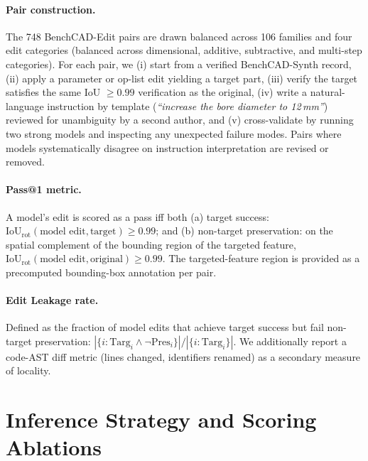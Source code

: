 \documentclass{article}
\begin{document}
\paragraph{Pair construction.} The 748 BenchCAD-Edit pairs are drawn balanced across 106 families and four edit categories (balanced across dimensional, additive, subtractive, and multi-step categories). For each pair, we (i) start from a verified BenchCAD-Synth record, (ii) apply a parameter or op-list edit yielding a target part, (iii) verify the target satisfies the same IoU $\geq 0.99$ verification as the original, (iv) write a natural-language instruction by template (\emph{``increase the bore diameter to 12\,mm''}) reviewed for unambiguity by a second author, and (v) cross-validate by running two strong models and inspecting any unexpected failure modes. Pairs where models systematically disagree on instruction interpretation are revised or removed.

\paragraph{Pass@1 metric.} A model's edit is scored as a pass iff both (a) target success: $\mathrm{IoU}_{\mathrm{rot}}(\text{model edit}, \text{target}) \geq 0.99$; and (b) non-target preservation: on the spatial complement of the bounding region of the targeted feature, $\mathrm{IoU}_{\mathrm{rot}}(\text{model edit}, \text{original}) \geq 0.99$. The targeted-feature region is provided as a precomputed bounding-box annotation per pair.

\paragraph{Edit Leakage rate.} Defined as the fraction of model edits that achieve target success but fail non-target preservation: $|\{i: \text{Targ}_i \wedge \neg\text{Pres}_i\}| / |\{i: \text{Targ}_i\}|$. We additionally report a code-AST diff metric (lines changed, identifiers renamed) as a secondary measure of locality.

\section{Inference Strategy and Scoring Ablations}
\label{app:ablation}
\end{document}
